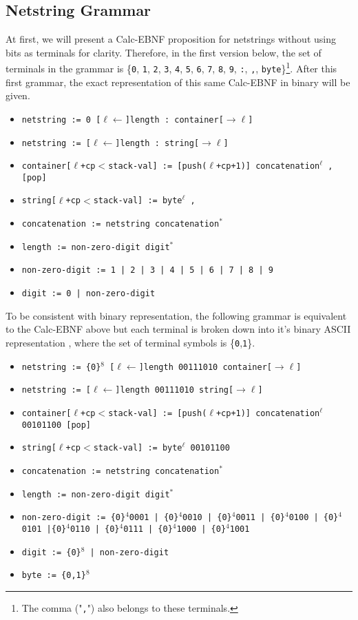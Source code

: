 \subsection{Netstring Grammar}
\label{5.2}
At first, we will present a Calc-EBNF proposition for netstrings without using bits as terminals for clarity. Therefore, in the first version below, the set of terminals in the grammar is \{\texttt{0}, \texttt{1}, \texttt{2}, \texttt{3}, \texttt{4}, \texttt{5}, \texttt{6}, \texttt{7}, \texttt{8}, \texttt{9}, \texttt{:}, \texttt{,}, \texttt{byte}\}\footnote{The comma ("\texttt{,}") also belongs to these terminals.}. After this first grammar, the exact representation of this same Calc-EBNF in binary will be given.
\begin{itemize}
    \item[] \texttt{netstring := 0 [$\ell\leftarrow$]length : container[$\rightarrow\ell$]} 
    \item[] \texttt{netstring := [$\ell\leftarrow$]length : string[$\rightarrow\ell$]}
    \item[] \texttt{container[$\ell$+cp$<$stack-val] := [push($\ell$+cp+1)] concatenation$^\ell$ , [pop]}
    \item[] \texttt{string[$\ell$+cp$<$stack-val] := byte$^\ell$ ,}
    \item[] \texttt{concatenation := netstring concatenation$^*$}
    \item[] \texttt{length := non-zero-digit digit$^*$}
    \item[] \texttt{non-zero-digit := 1 | 2 | 3 | 4 | 5 | 6 | 7 | 8 | 9}
    \item[]\texttt{digit := 0 | non-zero-digit}
\end{itemize}
To be consistent with binary representation, the following grammar is equivalent to the Calc-EBNF above but each terminal is broken down into it's binary ASCII representation \cite{ASCII-table}, where the set of terminal symbols is \{\texttt{0},\texttt{1}\}.
\begin{itemize}
    \item[] \texttt{netstring := \{0\}$^8$ [$\ell\leftarrow$]length 00111010 container[$\rightarrow\ell$]} 
    \item[] \texttt{netstring := [$\ell\leftarrow$]length 00111010 string[$\rightarrow\ell$]}
    \item[] \texttt{container[$\ell$+cp$<$stack-val] := [push($\ell$+cp+1)] concatenation$^\ell$ 00101100 [pop]}
    \item[] \texttt{string[$\ell$+cp$<$stack-val] := byte$^\ell$ 00101100}
    \item[] \texttt{concatenation := netstring concatenation$^*$}
    \item[] \texttt{length := non-zero-digit digit$^*$}
    \item[] \texttt{non-zero-digit := \{0\}$^4$0001 | \{0\}$^4$0010 | \{0\}$^4$0011 | \{0\}$^4$0100 | \{0\}$^4$0101 |\{0\}$^4$0110 | \{0\}$^4$0111 | \{0\}$^4$1000 | \{0\}$^4$1001}
    \item[]\texttt{digit := \{0\}$^8$ | non-zero-digit}
    \item[] \texttt{byte := \{0,1\}$^8$}
\end{itemize}

